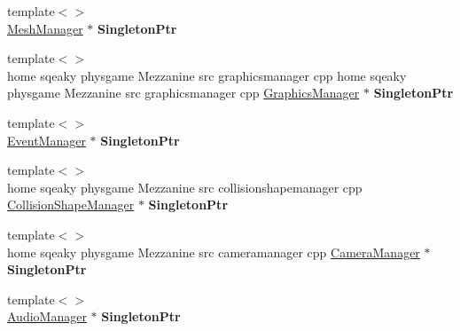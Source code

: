 \begin{DoxyCompactItemize}
\item 
\hypertarget{classMezzanine_1_1Singleton_aa773394d88e689a49d72de8bbd87c12d}{
{\footnotesize template$<$$>$ }\\\hyperlink{classMezzanine_1_1MeshManager}{MeshManager} $\ast$ {\bfseries SingletonPtr}}
\label{classMezzanine_1_1Singleton_aa773394d88e689a49d72de8bbd87c12d}

\item 
\hypertarget{classMezzanine_1_1Singleton_a702d2b206385b4adb3b95c3513f57693}{
{\footnotesize template$<$$>$ }\\home sqeaky physgame Mezzanine src graphicsmanager cpp home sqeaky physgame Mezzanine src graphicsmanager cpp \hyperlink{classMezzanine_1_1GraphicsManager}{GraphicsManager} $\ast$ {\bfseries SingletonPtr}}
\label{classMezzanine_1_1Singleton_a702d2b206385b4adb3b95c3513f57693}

\item 
\hypertarget{classMezzanine_1_1Singleton_a8376157cc0e67cf8448bc1724e5c2ade}{
{\footnotesize template$<$$>$ }\\\hyperlink{classMezzanine_1_1EventManager}{EventManager} $\ast$ {\bfseries SingletonPtr}}
\label{classMezzanine_1_1Singleton_a8376157cc0e67cf8448bc1724e5c2ade}

\item 
\hypertarget{classMezzanine_1_1Singleton_a6c1ab073b86c5305bca7319f1f96e134}{
{\footnotesize template$<$$>$ }\\home sqeaky physgame Mezzanine src collisionshapemanager cpp \hyperlink{classMezzanine_1_1CollisionShapeManager}{CollisionShapeManager} $\ast$ {\bfseries SingletonPtr}}
\label{classMezzanine_1_1Singleton_a6c1ab073b86c5305bca7319f1f96e134}

\item 
\hypertarget{classMezzanine_1_1Singleton_a7ff04934f33a84ebc600afa33906dc4d}{
{\footnotesize template$<$$>$ }\\home sqeaky physgame Mezzanine src cameramanager cpp \hyperlink{classMezzanine_1_1CameraManager}{CameraManager} $\ast$ {\bfseries SingletonPtr}}
\label{classMezzanine_1_1Singleton_a7ff04934f33a84ebc600afa33906dc4d}

\item 
\hypertarget{classMezzanine_1_1Singleton_a2280f1ce7ec5bc5afa7c4ab5fbf37c66}{
{\footnotesize template$<$$>$ }\\\hyperlink{classMezzanine_1_1AudioManager}{AudioManager} $\ast$ {\bfseries SingletonPtr}}
\label{classMezzanine_1_1Singleton_a2280f1ce7ec5bc5afa7c4ab5fbf37c66}

\end{DoxyCompactItemize}
